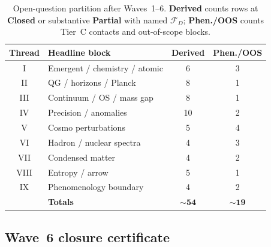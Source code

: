 \begin{table}[ht]
\centering
\footnotesize
\renewcommand{\arraystretch}{1.08}
\begin{tabular}{@{}clcc@{}}
\toprule
\textbf{Thread} & \textbf{Headline block} & \textbf{Derived} & \textbf{Phen./OOS} \\
\midrule
I & Emergent / chemistry / atomic & 6 & 3 \\
II & QG / horizons / Planck & 8 & 1 \\
III & Continuum / OS / mass gap & 8 & 1 \\
IV & Precision / anomalies & 10 & 2 \\
V & Cosmo perturbations & 5 & 4 \\
VI & Hadron / nuclear spectra & 4 & 3 \\
VII & Condensed matter & 4 & 2 \\
VIII & Entropy / arrow & 5 & 1 \\
IX & Phenomenology boundary & 4 & 2 \\
\midrule
 & \textbf{Totals} & $\mathbf{\sim 54}$ & $\mathbf{\sim 19}$ \\
\bottomrule
\end{tabular}
\caption{Open-question partition after Waves~1--6. \textbf{Derived} counts
rows at \textbf{Closed} or substantive \textbf{Partial} with named $\mathcal{F}_D$;
\textbf{Phen./OOS} counts Tier~C contacts and out-of-scope blocks.}
\label{tab:thread-9-partition}
\end{table}

\subsection{Wave~6 closure certificate}
\label{sec:wave6-thread9:closure}

